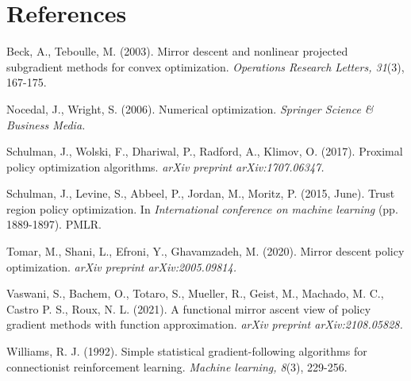 \documentclass[a4paper, 10pt]{article}
\begin{document}
\section*{References}

\medskip
\small
\begin{list}{}{%
    \setlength{\topsep}{0pt}%
    \setlength{\leftmargin}{0.2in}%
    \setlength{\listparindent}{-0.2in}%
    \setlength{\itemindent}{-0.2in}%
    \setlength{\parsep}{\parskip}%
  }%

\item[] Beck, A., Teboulle, M. (2003). Mirror descent and nonlinear projected subgradient methods for convex optimization. \textit{Operations Research Letters, 31}(3), 167-175.

\item[] Nocedal, J., Wright, S. (2006). Numerical optimization. \textit{Springer Science \& Business Media.}

\item[] Schulman, J., Wolski, F., Dhariwal, P., Radford, A., Klimov, O. (2017). Proximal policy optimization algorithms. \textit{arXiv preprint arXiv:1707.06347.}

\item[] Schulman, J., Levine, S., Abbeel, P., Jordan, M., Moritz, P. (2015, June). Trust region policy optimization. In \textit{International conference on machine learning} (pp. 1889-1897). PMLR.

  \item[] Tomar, M., Shani, L., Efroni, Y., Ghavamzadeh, M. (2020). Mirror descent policy optimization. \textit{arXiv preprint arXiv:2005.09814.}
  
  \item[] Vaswani, S., Bachem, O., Totaro, S., Mueller, R., Geist, M., Machado, M. C., Castro P. S., Roux, N. L. (2021). A functional mirror ascent view of policy gradient methods with function approximation. \textit{arXiv preprint arXiv:2108.05828.}

\item[] Williams, R. J. (1992). Simple statistical gradient-following algorithms for connectionist reinforcement learning. \textit{Machine learning, 8}(3), 229-256.
  
\end{list}
\end{document}
